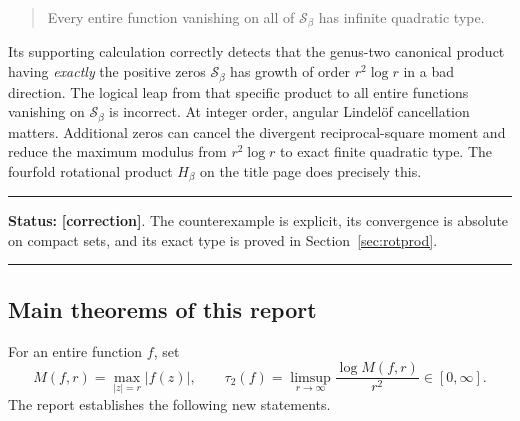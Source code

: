\documentclass[11pt,oneside]{article}
\theoremstyle{definition}
\theoremstyle{remark}
\newcommand{\Sbeta}{\mathcal S_\beta}
\newcommand{\statuscorrection}{\textcolor{correctionred}{\textbf{[correction]}}}
\newenvironment{statusbox}[1]
{\begin{center}\begin{minipage}{0.94\textwidth}\raggedright\hrule\vspace{0.45em}\textbf{Status:} #1\par\vspace{0.35em}}
{\vspace{0.35em}\hrule\end{minipage}\end{center}}
\begin{document}
\begin{quote}
Every entire function vanishing on all of $\Sbeta$ has infinite quadratic type.
\end{quote}

Its supporting calculation correctly detects that the genus-two canonical product having
\emph{exactly} the positive zeros $\Sbeta$ has growth of order $r^2\log r$ in a bad
direction.  The logical leap from that specific product to all entire functions vanishing
on $\Sbeta$ is incorrect.  At integer order, angular Lindel\"of cancellation matters.
Additional zeros can cancel the divergent reciprocal-square moment and reduce the maximum
modulus from $r^2\log r$ to exact finite quadratic type.  The fourfold rotational product
$H_\beta$ on the title page does precisely this.

\begin{statusbox}{\statuscorrection.  The counterexample is explicit, its convergence is
absolute on compact sets, and its exact type is proved in Section~\ref{sec:rotprod}.}
\end{statusbox}

\subsection{Main theorems of this report}

For an entire function $f$, set
\[
 M(f,r)=\max_{|z|=r}|f(z)|,
 \qquad
 \tau_2(f)=\limsup_{r\to\infty}\frac{\log M(f,r)}{r^2}
 \in[0,\infty].
\]
The report establishes the following new statements.
\end{document}
